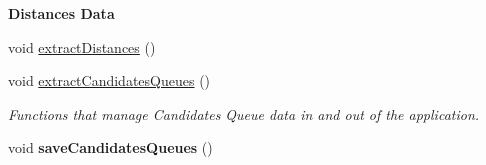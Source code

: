 \begin{Indent}\textbf{ Distances Data}\par
\begin{DoxyCompactItemize}
\item 
void \hyperlink{group___agency_gab893f05c69379631019010af71052595}{extract\+Distances} ()
\item 
void \hyperlink{group___agency_gaf587ae52b7b80696bbc7bba02b8238af}{extract\+Candidates\+Queues} ()
\begin{DoxyCompactList}\small\item\em Functions that manage Candidates Queue data in and out of the application. \end{DoxyCompactList}\item 
void {\bfseries save\+Candidates\+Queues} ()
\end{DoxyCompactItemize}
\end{Indent}
